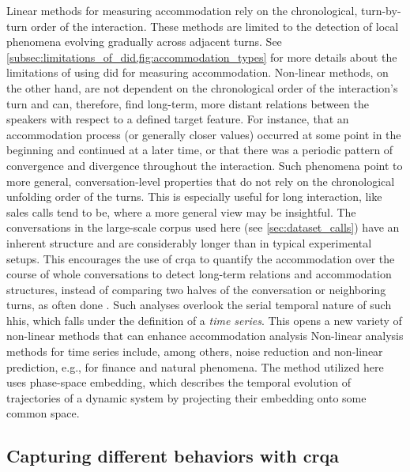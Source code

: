 Linear methods for measuring accommodation rely on the chronological, turn-by-turn order of the interaction.
These methods are limited to the detection of local phenomena evolving gradually across adjacent turns.
See \cref{subsec:limitations_of_did,fig:accommodation_types} for more details about the limitations of using \ac{did} for measuring accommodation.
Non-linear methods, on the other hand, are not dependent on the chronological order of the interaction's turn and can, therefore, find long-term, more distant relations between the speakers with respect to a defined target feature.
For instance, that an accommodation process (or generally closer values) occurred at some point in the beginning and continued at a later time, or that there was a periodic pattern of convergence and divergence throughout the interaction.
Such phenomena point to more general, conversation-level properties that do not rely on the chronological unfolding order of the turns.
This is especially useful for long interaction, like sales calls tend to be, where a more general view may be insightful.
The conversations in the large-scale corpus used here (see \cref{sec:dataset_calls}) have an inherent structure and are considerably longer than in typical experimental setups.
This encourages the use of \ac{crqa} to quantify the accommodation over the course of whole conversations to detect long-term relations and accommodation structures, instead of comparing two halves of the conversation or neighboring turns, as often done \citep{Levitan2013entrainment,Rahimi2018weighting}.
Such analyses overlook the serial temporal nature of such \acp{hhi}, which falls under the definition of a \emph{time series}.
This opens a new variety of non-linear methods that can enhance accommodation analysis
Non-linear analysis methods for time series include, among others, noise reduction and non-linear prediction, e.g., for finance and natural phenomena.
The method utilized here uses phase-space embedding, which describes the temporal evolution of trajectories of a dynamic system by projecting their embedding onto some common space.

\subsection{Capturing different behaviors with \acs{crqa}}
\label{subsec:capturing_behaviors}

